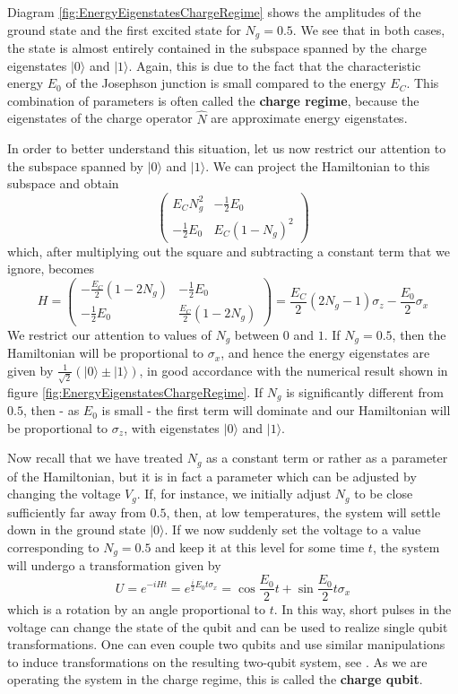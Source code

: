 \documentclass[a4paper, draft]{article}
\theoremstyle{own}
\theoremstyle{remark}
\begin{document}
Diagram \ref{fig:EnergyEigenstatesChargeRegime} shows the amplitudes of the ground state and the first excited state for $N_g = 0.5$. We see that in both cases, the state is almost entirely contained in the subspace spanned by the charge eigenstates $|0 \rangle$ and $|1 \rangle$. Again, this is due to the fact that the characteristic energy $E_0$ of the Josephson junction is small compared to the energy $E_C$. This combination of parameters is often called the {\bf charge regime}, because the eigenstates of the charge operator $\hat{N}$ are approximate energy eigenstates. 

In order to better understand this situation, let us now restrict our attention to the subspace spanned by $|0 \rangle$ and $|1 \rangle$. We can project the Hamiltonian to this subspace and obtain
$$
\begin{pmatrix}
E_C N_g^2 &  - \frac{1}{2} E_0 
\\
- \frac{1}{2} E_0 & E_C (1 - N_g)^2
\end{pmatrix}
$$
which, after multiplying out the square and subtracting a constant term that we ignore, becomes
$$
H = 
\begin{pmatrix}
- \frac{E_C}{2} (1 - 2N_g) &  - \frac{1}{2} E_0 
\\
- \frac{1}{2} E_0 &  \frac{E_C}{2} (1 - 2N_g)
\end{pmatrix}
=
\frac{E_C}{2} (2N_g - 1) \sigma_z - \frac{E_0}{2} \sigma_x
$$
We restrict our attention to values of $N_g$ between $0$ and $1$. If $N_g = 0.5$, then the Hamiltonian will be proportional to $\sigma_x$, and hence the energy eigenstates are given by $\frac{1}{\sqrt{2}} (|0 \rangle \pm |1 \rangle)$, in good accordance with the numerical result shown in figure \ref{fig:EnergyEigenstatesChargeRegime}. If $N_g$ is significantly different from $0.5$, then - as $E_0$ is small - the first term will dominate and our Hamiltonian will be proportional to $\sigma_z$, with eigenstates $|0 \rangle$ and $|1 \rangle$.

Now recall that we have treated $N_g$ as a constant term or rather as a parameter of the Hamiltonian, but it is in fact a parameter which can be adjusted by changing the voltage $V_g$. If, for instance, we initially adjust $N_g$ to be close sufficiently far away from $0.5$, then, at low temperatures, the system will settle down in the ground state $|0 \rangle$.  If we now suddenly set the voltage to a value corresponding to $N_g = 0.5$ and keep it at this level for some time $t$, the system will undergo a transformation given by
$$
U = e^{-iHt} = e^{\frac{i}{2} E_0 t\sigma_x} = \cos \frac{E_0}{2}t + \sin  \frac{E_0}{2}t \sigma_x
$$
which is a rotation by an angle proportional to $t$. In this way, short pulses in the voltage can change the state of the qubit and can be used to realize single qubit transformations. One can even couple two qubits and use similar manipulations to induce transformations on the resulting two-qubit system, see \cite{ShnirmanEtAl}. As we are operating the system in the charge regime, this is called the {\bf charge qubit}.
\end{document}
